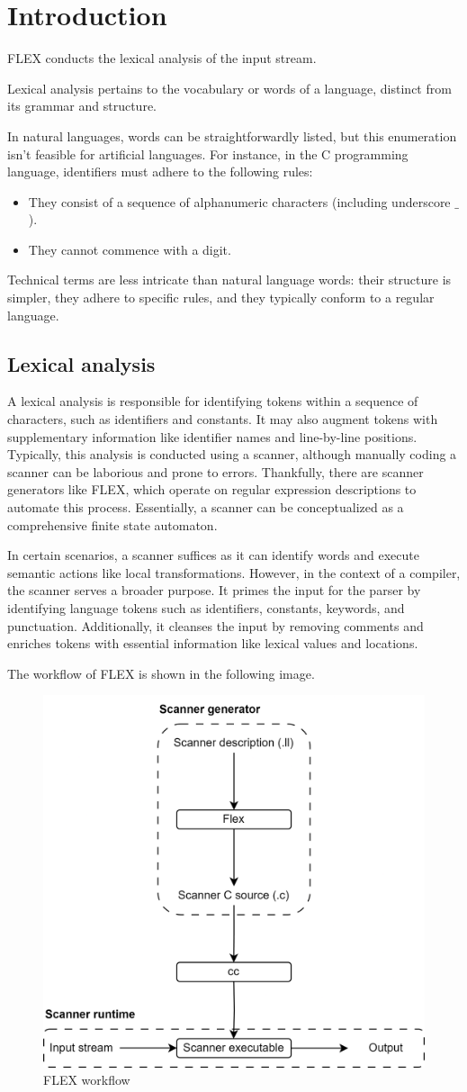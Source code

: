 \section{Introduction}

FLEX conducts the lexical analysis of the input stream.
\begin{definition}
    Lexical analysis pertains to the vocabulary or words of a language, distinct from its grammar and structure.
\end{definition}

In natural languages, words can be straightforwardly listed, but this enumeration isn't feasible for artificial languages. 
For instance, in the C programming language, identifiers must adhere to the following rules:
\begin{itemize}
    \item They consist of a sequence of alphanumeric characters (including underscore $\_$).
    \item They cannot commence with a digit.
\end{itemize}
Technical terms are less intricate than natural language words: their structure is simpler, they adhere to specific rules, and they typically conform to a regular language.

\subsection{Lexical analysis}
A lexical analysis is responsible for identifying tokens within a sequence of characters, such as identifiers and constants. 
It may also augment tokens with supplementary information like identifier names and line-by-line positions. 
Typically, this analysis is conducted using a scanner, although manually coding a scanner can be laborious and prone to errors. 
Thankfully, there are scanner generators like FLEX, which operate on regular expression descriptions to automate this process. 
Essentially, a scanner can be conceptualized as a comprehensive finite state automaton.

In certain scenarios, a scanner suffices as it can identify words and execute semantic actions like local transformations. 
However, in the context of a compiler, the scanner serves a broader purpose. 
It primes the input for the parser by identifying language tokens such as identifiers, constants, keywords, and punctuation. 
Additionally, it cleanses the input by removing comments and enriches tokens with essential information like lexical values and locations.

The workflow of FLEX is shown in the following image. 
\begin{figure}[H]
    \centering
    \includegraphics[width=0.39\linewidth]{images/flex.png}
    \caption{FLEX workflow}
\end{figure}